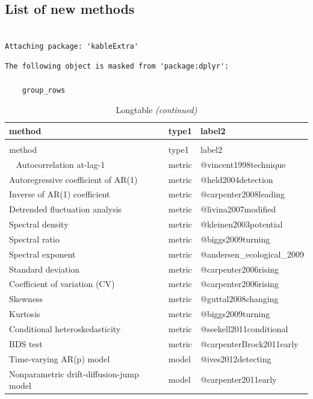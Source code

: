 \documentclass[12pt,twoside,openany]{reedthesis}
\begin{document}
\subsection{List of new methods}\label{list-of-new-methods}
\begin{verbatim}

Attaching package: 'kableExtra'
\end{verbatim}
\begin{verbatim}
The following object is masked from 'package:dplyr':

    group_rows
\end{verbatim}
\begin{longtable}{lll}
\caption{\label{tab:methodsMetricsListTab1}Longtable}\\
\toprule
method & type1 & label2\\
\midrule
\endfirsthead
\caption[]{\label{tab:methodsMetricsListTab1}Longtable \textit{(continued)}}\\
\toprule
method & type1 & label2\\
\midrule
\endhead
\
\endfoot
\bottomrule
\endlastfoot
Autocorrelation at-lag-1 & metric & @vincent1998technique\\
Autoregressive coefficient of AR(1) & metric & @held2004detection\\
Inverse of AR(1) coefficient & metric & @carpenter2008leading\\
Detrended fluctuation analysis & metric & @livina2007modified\\
Spectral density & metric & @kleinen2003potential\\
\addlinespace
Spectral ratio & metric & @biggs2009turning\\
Spectral exponent & metric & @andersen\_ecological\_2009\\
Standard deviation & metric & @carpenter2006rising\\
Coefficient of variation (CV) & metric & @carpenter2006rising\\
Skewness & metric & @guttal2008changing\\
\addlinespace
Kurtosis & metric & @biggs2009turning\\
Conditional heteroskedasticity & metric & @seekell2011conditional\\
BDS test & metric & @carpenterBrock2011early\\
Time-varying AR(p) model & model & @ives2012detecting\\
Nonparametric drift-diffusion-jump model & model & @carpenter2011early\\

\end{longtable}
\end{document}
